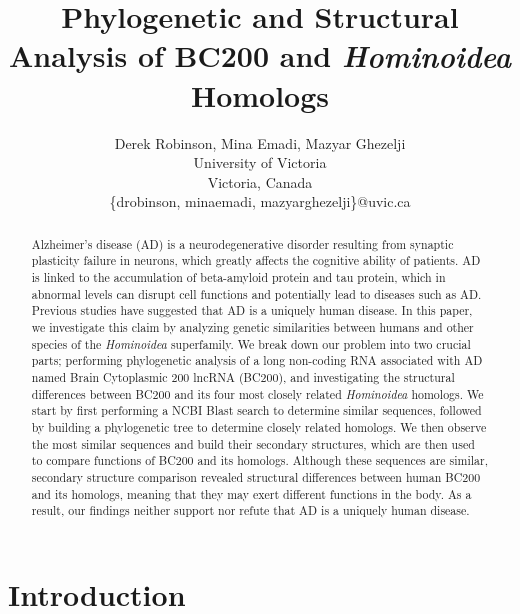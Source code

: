 \documentclass[conference, 11pt]{IEEEtran}
\begin{document}


\title{Phylogenetic and Structural Analysis of BC200 and \emph{Hominoidea} Homologs}

\author{Derek Robinson, Mina Emadi, Mazyar Ghezelji\\
University of Victoria\\
Victoria, Canada \\
\{drobinson, minaemadi, mazyarghezelji\}@uvic.ca}

\maketitle

\begin{abstract}
Alzheimer’s disease (AD) is a neurodegenerative disorder resulting from synaptic plasticity failure in neurons, which greatly affects the cognitive ability of patients. 
AD is linked to the accumulation of beta-amyloid protein and tau protein, which in abnormal levels can disrupt cell functions and potentially lead to diseases such as AD. 
Previous studies have suggested that AD is a uniquely human disease. 
In this paper, we investigate this claim by analyzing genetic similarities between humans and other species of the \emph{Hominoidea} superfamily.
We break down our problem into two crucial parts; performing phylogenetic analysis of a long non-coding RNA associated with AD named Brain Cytoplasmic 200 lncRNA (BC200), and investigating the structural differences between BC200 and its four most closely related \emph{Hominoidea} homologs. 
We start by first performing a NCBI Blast search to determine similar sequences, followed by building a phylogenetic tree to determine closely related homologs.
We then observe the most similar sequences and build their secondary structures, which are then used to compare functions of BC200 and its homologs.
Although these sequences are similar, secondary structure comparison revealed structural differences between human BC200 and its homologs, meaning that they may exert different functions in the body.
As a result, our findings neither support nor refute that AD is a uniquely human disease.

\end{abstract}

\section{Introduction}\label{sec:intro}
\end{document}

